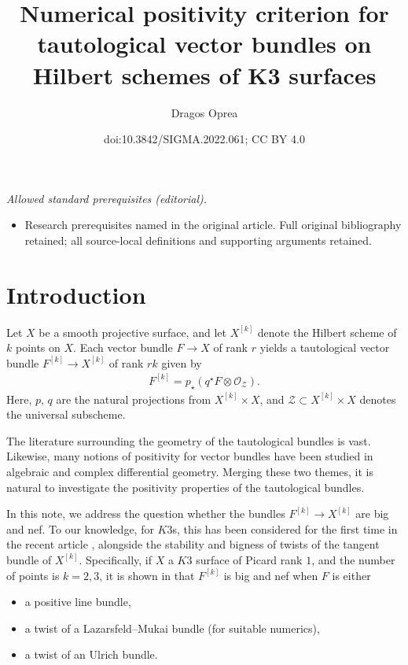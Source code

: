\documentclass[10pt,a4paper]{amsart}
\title{Numerical positivity criterion for tautological vector bundles on Hilbert schemes of K3 surfaces}
\author{Dragos Oprea}
\date{doi:10.3842/SIGMA.2022.061; CC BY 4.0}
\numberwithin{equation}{section}
\begin{document}
\maketitle
\noindent\textit{Allowed standard prerequisites (editorial).}\begin{itemize}
\item Research prerequisites named in the original article. Full original bibliography retained; all source-local definitions and supporting arguments retained.
\end{itemize}\medskip
\section{Introduction}Let $X$ be a smooth projective surface, and let $X^{[k]}$ denote the Hilbert scheme of $k$ points on $X$. Each vector bundle $F\to X$ of rank $r$ yields a tautological vector bundle $F^{[k]}\to X^{[k]}$ of rank $rk$ given by \vspace{-.5ex}
\begin{gather*}
F^{[k]}=p_{\star} (q^{\star} F\otimes \mathcal O_{\mathcal Z}).
\end{gather*}
Here, $p$, $q$ are the natural projections from $X^{[k]}\times X$, and $\mathcal Z\subset X^{[k]}\times X$ denotes the universal subscheme.

The literature surrounding the geometry of the tautological bundles is vast. Likewise, many notions of positivity for vector bundles have been studied in algebraic and complex differential geometry. Merging these two themes, it is natural to investigate the positivity properties of the tautological bundles.

In this note, we address the question whether the bundles $F^{[k]}\to X^{[k]}$ are big and nef.
To our knowledge, for $K3$s, this has been considered for the first time in the recent article \cite{BBF}, alongside the stability and bigness of twists of the tangent bundle of $X^{[k]}$. Specifically, if $X$ a $K3$ surface of Picard rank $1$, and the number of points is $k=2, 3$, it is shown in \cite{BBF} that $F^{[k]}$ is big and nef when $F$ is either\vspace{-.5ex}
\begin{itemize}\itemsep=-1pt
\item [$(a)$] a positive line bundle,
\item [$(b)$] a twist of a Lazarsfeld--Mukai bundle (for suitable numerics),
\item [$(c)$] a twist of an Ulrich bundle.
\end{itemize}
\end{document}
